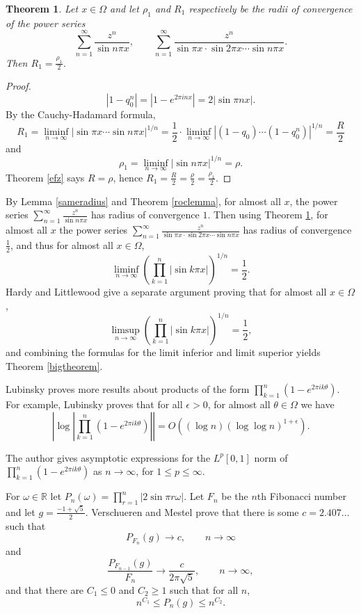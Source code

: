 \documentclass{article}
\newtheorem{theorem}{Theorem}
\begin{document}
\begin{theorem}
Let $x \in \Omega$ and let $\rho_1$ and $R_1$  respectively be the radii  of convergence of the power
series
\[
\sum_{n=1}^\infty \frac{z^n}{\sin n\pi x},\qquad \sum_{n=1}^\infty \frac{z^n}{\sin \pi x \cdot
\sin 2\pi x  \cdots \sin n\pi x}.
\]
Then $R_1=\frac{\rho_1}{2}$. 
\label{HLsineseries}
\end{theorem}
\begin{proof}
\[
|1-q_0^n| = |1-e^{2\pi inx}| = 2 |\sin \pi nx|.
\]
By the Cauchy-Hadamard formula, 
\[
R_1 = \liminf_{n \to \infty} |\sin \pi x\cdots \sin n\pi x|^{1/n} = 
\frac{1}{2} \cdot \liminf_{n \to \infty} |(1-q_0)\cdots (1-q_0^n)|^{1/n}
=\frac{R}{2}
\]
and 
\[
\rho_1 = \liminf_{n \to \infty} |\sin n\pi x|^{1/n} = 
\rho.
\]
Theorem \ref{efz} says $R=\rho$, hence $R_1 = \frac{R}{2} = \frac{\rho}{2}=\frac{\rho_1}{2}$.  
\end{proof}




By Lemma \ref{sameradius} and Theorem \ref{roclemma}, for almost all $x$, the power series $\sum_{n=1}^\infty \frac{z^n}{\sin n\pi x}$ has radius of convergence $1$.
Then using Theorem \ref{HLsineseries}, for
almost all $x$  the power series $\sum_{n=1}^\infty \frac{z^n}{\sin \pi x \cdot
\sin 2\pi x  \cdots \sin n\pi x}$ has radius of convergence $\frac{1}{2}$, and thus for almost all $x \in \Omega$,
\[
\liminf_{n \to \infty} \left( \prod_{k=1}^n |\sin k\pi x| \right)^{1/n} = \frac{1}{2}.
\]
Hardy and Littlewood give a separate argument \cite[p.~88, Eq.~4.3]{XXIV} proving that for almost all $x \in \Omega$,
\[
\limsup_{n \to \infty} \left( \prod_{k=1}^n |\sin k\pi x| \right)^{1/n} = \frac{1}{2},
\]
and combining the formulas for the limit inferior and limit superior yields Theorem \ref{bigtheorem}.



Lubinsky \cite{MR1684685} proves more results about products of the form $\prod_{k=1}^n (1-e^{2\pi i k\theta})$. For example,
Lubinsky \cite[p.~219, Theorem 1.1]{MR1684685} proves that for all $\epsilon>0$, for almost all
$\theta \in \Omega$ we have
\[
\left|\log \left| \prod_{k=1}^n (1-e^{2\pi ik\theta})\right| \right| = O((\log n)(\log \log n)^{1+\epsilon}).
\]

The  author \cite[p.~532, Theorem 2]{MR3061031} gives asymptotic expressions for  the $L^p[0,1]$ norm
of
$\prod_{k=1}^n (1-e^{2\pi ik\theta})$ as $n \to \infty$, for $1 \leq p \leq \infty$.

For $\omega \in  \mathbb{R}$ let $P_n(\omega) = \prod_{r=1}^n |2\sin \pi r \omega|$. 
Let $F_n$ be the $n$th Fibonacci number and let
 $g = \frac{-1+\sqrt{5}}{2}$.
 Verschueren and Mestel \cite[p.~204, Theorem 2.2]{verschueren} prove that
 there is some $c = 2.407\ldots$ such that
\[
P_{F_n}(g) \to c,\qquad n \to \infty
\]
and
\[
\frac{P_{F_{n-1}}(g)}{F_n} \to \frac{c}{2\pi\sqrt{5}},\qquad n \to \infty,
\]
and that there are $C_1 \leq 0$ and $C_2 \geq 1$ such that for all $n$,
\[
n^{C_1} \leq P_n(g) \leq n^{C_2}.
\]
\end{document}
